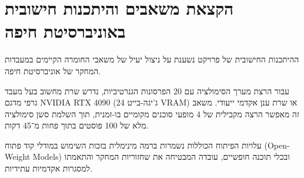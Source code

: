 \section{הקצאת משאבים והיתכנות חישובית באוניברסיטת חיפה}
\label{sec:impl_resource_allocation}
ההיתכנות החישובית של פרויקט \projectname{} נשענת על ניצול יעיל של משאבי החומרה הקיימים במעבדות המחקר של אוניברסיטת חיפה.

עבור הרצת מערך הסימולציה עם 20 הפרסונות הגנרטיביות, נדרש שרת מחשוב בעל מעבד גרפי מדגם \textenglish{NVIDIA RTX 4090} (24 ג'יגה-בייט \textenglish{VRAM}) או שרת ענן אקדמי ייעודי. משאב זה מאפשר הרצה מקבילית של 4 מופעי סוכנים מקומיים בו-זמנית, תוך השלמת סשן סימולציה מלא של 100 פוסטים בתוך פחות מ־45 דקות.

עלויות הפיתוח הכוללות נשמרות ברמה מינימלית בזכות השימוש במודלי קוד פתוח (\textenglish{Open-Weight Models}) ובכלי תוכנה חופשיים, עובדה המבטיחה את שחזוריות המחקר והתאמתו למסגרות אקדמיות עתידיות.
